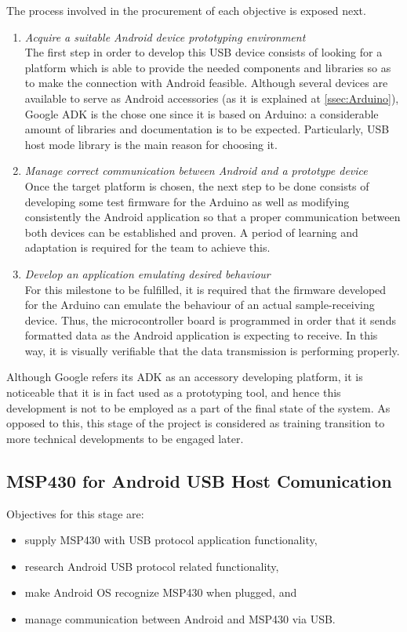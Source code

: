 		The process involved in the procurement of each objective is exposed next.

		\begin{enumerate}
			\item \emph{Acquire a suitable Android device prototyping environment}\\
				The first step in order to develop this USB device consists of looking for a platform which
				is able to provide the needed components and libraries so as to make the connection with
				Android feasible. Although several devices are available to serve as Android accessories (as
				it is explained at \autoref{ssec:Arduino}),	Google ADK is the chose one since it is based on
				Arduino: a considerable amount of libraries and documentation is to be expected. Particularly,
				USB host mode library is the main reason for choosing it.

			\item \emph{Manage correct communication between Android and a prototype device}\\
				Once the target platform is chosen, the next step to be done consists of developing some
				test firmware for the Arduino as well as modifying consistently the Android application
				so that a proper communication between both devices can be established and proven. A period 
				of learning and adaptation is required for the team to achieve this.

			\item \emph{Develop an application emulating desired behaviour}\\
				For this milestone to be fulfilled, it is required that the firmware developed for the
				Arduino can emulate the behaviour of an actual sample-receiving device. Thus, the
				microcontroller board is programmed in order that it sends formatted data as the Android
				application is expecting to receive. In this way, it is visually verifiable that the
				data transmission is performing properly.
		\end{enumerate}

		Although Google refers its ADK as an accessory developing platform, it is noticeable that it is
		in fact used as a prototyping tool, and hence this development is not to be employed as a part
		of the final state of the system. As opposed to this, this stage of the project is considered as
		training transition to more technical developments to be engaged later.

	\subsection{MSP430 for Android USB Host Comunication}
	\label{ssec:Android.USB}
		Objectives for this stage are:
		\begin{itemize}
			\item supply MSP430 with USB protocol application functionality,
			\item research Android USB protocol related functionality,
			\item make Android OS recognize MSP430 when plugged, and
			\item manage communication between Android and MSP430 via USB.
		\end{itemize}

